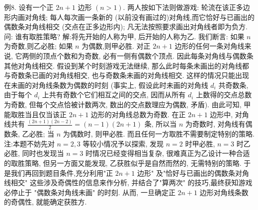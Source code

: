 例8. 设有一个正 $2 n+1$ 边形 $(n>1)$. 两人按如下法则做游戏: 轮流在该正多边形内画对角线; 每人每次画一条新的 (以前没有画过的)对角线,而它恰好与已画出的偶数条对角线相交 (交点在正多边形内); 凡无法按照要求画出对角线者即为负方.
问: 谁有取胜策略?
解:将先开始的人称为甲, 后开始的人称为乙.
我们断言: 如果 $n$ 为奇数,则乙必胜; 如果 $n$ 为偶数,则甲必胜.
对正 $2 n+1$ 边形的任何一条对角线来说, 它两侧的顶点个数和为奇数, 必有一侧有偶数个顶点.
因此每条对角线与偶数条其他对角线相交.
假设到某个时刻游戏无法继续, 那么此时每条未画出的对角线都与奇数条已画的对角线相交, 也与奇数条未画的对角线相交.
这样的情况只能出现在未画的对角线条数为偶数的时刻 (事实上, 假设此时未画的对角线 $d_i$ 共奇数条, 由于每个 $d_i$ 上共有奇数个它们相互之间的交点, 因而从所有 $d_i$ 上数得的交点总数为奇数, 但每个交点恰被计数两次, 数出的交点数理应为偶数, 矛盾). 由此可知, 甲能取胜当且仅当该正 $2 n+1$ 边形的对角线总数为奇数.
在正 $2 n+1$ 边形中, 对角线共有 $\frac{(2 n+1)(2 n-2)}{2}=(n-1)(2 n+1)$ 条,
所以当 $n$ 为奇数时, 对角线有偶数条, 乙必胜; 当 $n$ 为偶数时, 则甲必胜.
而且任何一方取胜不需要制定特别的策略.
注:本题不妨先对 $n=2,3$ 等较小情况予以探索, 发现 $n=2$ 时甲必胜, $n=3$ 时乙必胜, 同时也发现当 $n=3$ 时情况已经变得相当复杂, 很难真正为乙设计一种合适的取胜策略, 但另一方面又能发现, 乙获胜似乎是自然而然的, 无需特别的策略.
于是我们再回到题目条件,充分利用"正 $2 n+1$ 边形" 及"恰好与已画出的偶数条对角线相交" 这些涉及奇偶性的信息来作分析, 并结合了"算两次" 的技巧,最终获知游戏必停止于 "偶数条对角线未画" 的时刻.
从而, 一旦确定正 $2 n+1$ 边形对角线条数的奇偶性, 就能确定获胜方.


